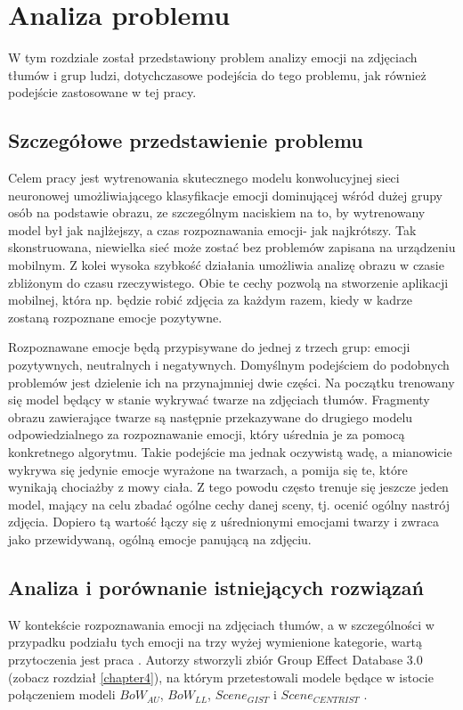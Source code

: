 \chapter{Analiza problemu}
\thispagestyle{chapterBeginStyle}
\label{chapter3}


W tym rozdziale został przedstawiony problem analizy emocji na zdjęciach tłumów i grup ludzi, dotychczasowe podejścia do tego problemu, jak również podejście zastosowane w tej pracy.


\section{Szczegółowe przedstawienie problemu}
Celem pracy jest wytrenowania skutecznego modelu konwolucyjnej sieci neuronowej umożliwiającego klasyfikacje emocji dominującej wśród dużej grupy osób na podstawie obrazu, ze szczególnym naciskiem na to, by wytrenowany model był jak najlżejszy, a czas rozpoznawania emocji- jak najkrótszy. Tak skonstruowana, niewielka sieć może zostać bez problemów zapisana na urządzeniu mobilnym. Z kolei wysoka szybkość działania umożliwia analizę obrazu w czasie zbliżonym do czasu rzeczywistego. Obie te cechy pozwolą na stworzenie aplikacji mobilnej, która np. będzie robić zdjęcia za każdym razem, kiedy w kadrze zostaną rozpoznane emocje pozytywne.

Rozpoznawane emocje będą przypisywane do jednej z trzech grup: emocji pozytywnych, neutralnych i negatywnych. Domyślnym podejściem do podobnych problemów jest dzielenie ich na przynajmniej dwie części. Na początku trenowany się model będący w stanie wykrywać twarze na zdjęciach tłumów. Fragmenty obrazu zawierające twarze są następnie przekazywane do drugiego modelu odpowiedzialnego za rozpoznawanie emocji, który uśrednia je za pomocą konkretnego algorytmu. Takie podejście ma jednak oczywistą wadę, a mianowicie wykrywa się jedynie emocje wyrażone na twarzach, a pomija się te, które wynikają chociażby z mowy ciała. Z tego powodu często trenuje się jeszcze jeden model, mający na celu zbadać ogólne cechy danej sceny, tj. ocenić ogólny nastrój zdjęcia. Dopiero tą wartość łączy się z uśrednionymi emocjami twarzy i zwraca jako przewidywaną, ogólną emocje panującą na zdjęciu.
 
 
\section{Analiza i porównanie istniejących rozwiązań}
W kontekście rozpoznawania emocji na zdjęciach tłumów, a w szczególności w przypadku podziału tych emocji na trzy wyżej wymienione kategorie, wartą przytoczenia jest praca \cite{GAD}. Autorzy stworzyli zbiór Group Effect Database 3.0 (zobacz rozdział \ref{chapter4}), na którym przetestowali modele będące w istocie połączeniem modeli $BoW_{AU}$, $BoW_{LL}$, $Scene_{GIST}$ \cite{GIST} i $Scene_{CENTRIST}$ \cite{CENTRIST}.

